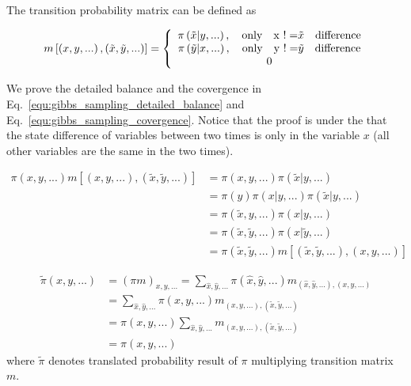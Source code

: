 \documentclass[runningheads,openany]{xhlPaper}
\begin{document}
The transition probability matrix can be defined as 

\begin{equation}
\label{equ:gibbs_sampling_transtion_matrix}
m\left[ {\left( {x,y,...} \right),\left( {\tilde x,\tilde y,...} \right)} \right] = \left\{ {\begin{array}{*{20}{c}}
{\pi \left( {\tilde x|y,...} \right),\quad{\rm{only \quad x\ != }}\tilde x{\rm{\quad difference}}}\\
{\pi \left( {\tilde y|x,...} \right),\quad{\rm{only \quad y\ != }}\tilde y{\rm{\quad difference}}}\\
0
\end{array}} \right.
\end{equation}

We prove the detailed balance and the covergence in Eq.~\ref{equ:gibbs_sampling_detailed_balance} and Eq.~\ref{equ:gibbs_sampling_covergence}.
Notice that the proof is under the that the state difference of variables between two times is only in the variable $x$ (all other variables are the same in the two times).

\begin{equation}
\label{equ:gibbs_sampling_detailed_balance}
\begin{aligned}
\pi \left( {x,y,...} \right)m\left[ {\left( {x,y,...} \right),\left( {\tilde x,\tilde y,...} \right)} \right] &= \pi \left( {x,y,...} \right)\pi \left( {\tilde x|y,...} \right)\\
 &= \pi \left( y \right)\pi \left( {x|y,...} \right)\pi \left( {\tilde x|y,...} \right)\\
 &= \pi \left( {\tilde x,y,...} \right)\pi \left( {x|y,...} \right)\\
 &= \pi \left( {\tilde x,\tilde y,...} \right)\pi \left( {x|\tilde y,...} \right)\\
 &= \pi \left( {\tilde x,\tilde y,...} \right)m\left[ {\left( {\tilde x,\tilde y,...} \right),\left( {x,y,...} \right)} \right]
\end{aligned}
\end{equation}

\begin{equation}
\label{equ:gibbs_sampling_covergence}
\begin{aligned}
\tilde \pi \left( {x,y,...} \right) &= {\left( {\pi m} \right)_{x,y,...}} = \sum\limits_{\hat x,\hat y,...} {\pi \left( {\hat x,\hat y,...} \right){m_{\left( {\hat x,\hat y,...} \right),\left( {x,y,...} \right)}}} \\
 &= \sum\limits_{\hat x,\hat y,...} {\pi \left( {x,y,...} \right){m_{\left( {x,y,...} \right),\left( {\tilde x,\tilde y,...} \right)}}} \\
 &= \pi \left( {x,y,...} \right)\sum\limits_{\hat x,\hat y,...} {{m_{\left( {x,y,...} \right),\left( {\tilde x,\tilde y,...} \right)}}} \\
 &= \pi \left( {x,y,...} \right)
\end{aligned}
\end{equation}
where $\tilde \pi$ denotes translated probability result of $\pi$ multiplying transition matrix $m$.
\end{document}
